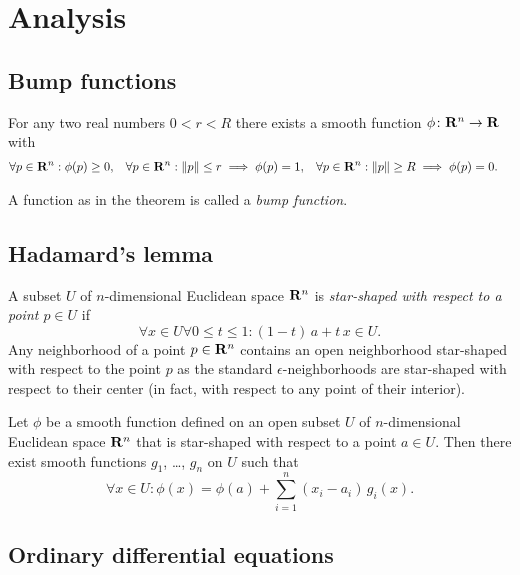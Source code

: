 \chapter{Analysis}

\section{Bump functions}
\label{sec:bump_functions}

\begin{thm}
  \label{thm:bump_function}
  For any two real numbers $0 < r < R$ there exists a smooth
  function $\phi\colon \mathbf{R}^n \to \mathbf{R}$ with
  \begin{align*}
    \forall p \in \mathbf{R}^n: \phi(p) & \ge 0, &
    \forall p \in \mathbf{R}^n: \lVert p\rVert \leq r \implies \phi(p) & = 1, &
    \forall p \in \mathbf{R}^n: \lVert p\rVert \geq R \implies \phi(p) & = 0.
  \end{align*}
\end{thm}

A function as in the theorem is called a \emph{bump function}.

\section{Hadamard's lemma}

A subset $U$ of $n$-dimensional Euclidean space $\mathbf{R}^n$ is \emph{star-shaped with
respect to a point $p \in U$} if
\[
  \forall x \in U \forall 0 \leq t \leq 1 :
  (1 - t) \, a + t \, x \in U.
\]
Any neighborhood of a point $p \in \mathbf{R}^n$ contains an open neighborhood
star-shaped with respect to the point $p$ as the standard $\epsilon$-neighborhoods
are star-shaped with respect to their center (in fact, with respect to any point
of their interior).

\begin{thm}
  \label{thm:hadamard}
  Let $\phi$ be a smooth function defined on an open subset $U$ of $n$-dimensional
  Euclidean space $\mathbf{R}^n$ that is star-shaped with respect to a point $a \in U$.
  Then there exist smooth functions $g_1$, \dots, $g_n$ on $U$ such that
  \[
    \forall x \in U: \phi(x) = \phi(a) + \sum_{i = 1}^n (x_i - a_i) \, g_i(x).
  \]
\end{thm}

\section{Ordinary differential equations}

